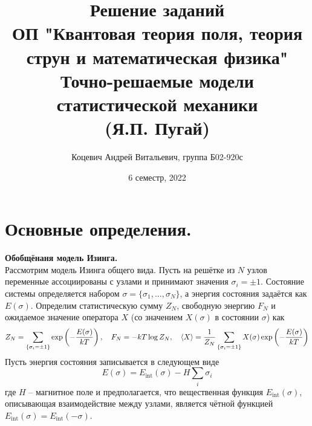 \documentclass[12pt]{article}
\title{Решение заданий\\ ОП "Квантовая теория поля, теория струн и математическая физика"\\[2cm]
Точно-решаемые модели статистической механики\\ (Я.П. Пугай)}
\author{Коцевич Андрей Витальевич, группа Б02-920с}
\date{6 семестр, 2022}
\theoremstyle{definition}
\begin{document}
\maketitle
\newpage
\tableofcontents{}
\newpage
\section{Основные определения.}
\textbf{Обобщёнаня модель Изинга.}\\
Рассмотрим модель Изинга общего вида. Пусть на решётке из $N$ узлов переменные ассоциированы с узлами и принимают значения $\sigma_i=\pm1$. Состояние системы определяется набором $\sigma=\{\sigma_1,...,\sigma_N\}$, а энергия состояния задаётся как $E(\sigma)$. Определим статистическую сумму $Z_N$, свободную энергию $F_N$ и ожидаемое значение оператора $X$ (со значением $X(\sigma)$ в состоянии $\sigma$) как
\begin{equation}
    Z_N=\sum\limits_{\{\sigma_i=\pm1\}}\exp\left(-\frac{E(\sigma)}{kT}\right),\quad F_N=-kT\log Z_N,\quad \braket{X}=\frac{1}{Z_N}\sum\limits_{\{\sigma_i=\pm1\}}X(\sigma)\exp\left(-\frac{E(\sigma)}{kT}\right)
\end{equation}
Пусть энергия состояния записывается в следующем виде
\begin{equation}
    E(\sigma)=E_\text{int}(\sigma)-H\sum\limits_i\sigma_i
\end{equation}
где $H$ -- магнитное поле и предполагается, что вещественная функция $E_\text{int}(\sigma)$, описывающая взаимодействие между узлами, является чётной функцией $E_\text{int}(\sigma)=E_\text{int}(-\sigma)$.
\end{document}
